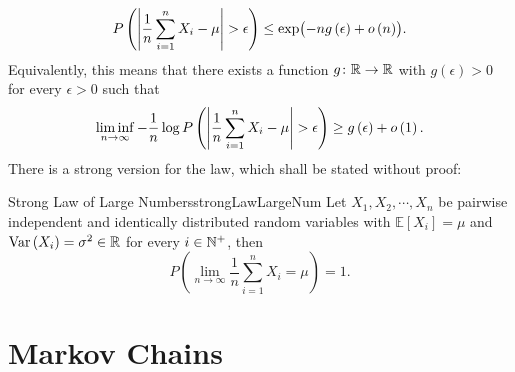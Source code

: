 \documentclass[math, code]{amznotes}
\theoremstyle{remark}
\begin{document}
\begin{equation*}
    P\left({\left\lvert {\frac{1}{n}\sum_{i = 1}^nX_i - \mu} \right\rvert} > \epsilon\right) \leq \exp\bigl(-ng\left(\epsilon\right) + o\left(n\right)\bigr).
\end{equation*}
Equivalently, this means that there exists a function $g \colon \mathbb{R} \to \mathbb{R}$ with $g\left(\epsilon\right) > 0$ for every $\epsilon > 0$ such that 
\begin{equation*}
    \liminf_{n \to \infty}-\frac{1}{n}\log P\left({\left\lvert {\frac{1}{n}\sum_{i = 1}^nX_i - \mu} \right\rvert} > \epsilon\right) \geq g\left(\epsilon\right) + o\left(1\right).
\end{equation*}
There is a strong version for the law, which shall be stated without proof:
\begin{thmbox}{Strong Law of Large Numbers}{strongLawLargeNum}
    Let $X_1, X_2, \cdots, X_n$ be pairwise independent and identically distributed random variables with $\mathbb{E}[X_i] = \mu$ and $\mathrm{Var}\left(X_i\right) = \sigma^2 \in \mathbb{R}$ for every $i \in \mathbb{N}^+$, then 
    \begin{equation*}
        P\left(\lim_{n \to \infty}\frac{1}{n}\sum_{i = 1}^{n}X_i = \mu\right) = 1.
    \end{equation*}
\end{thmbox}
\chapter{Markov Chains}
\end{document}

